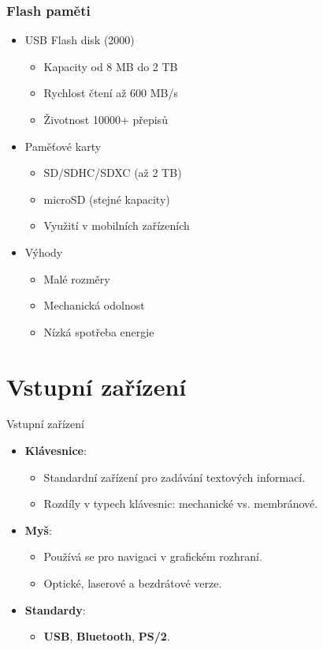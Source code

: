 \documentclass[aspectratio=43]{beamer}
\begin{document}
\begin{frame}
\frametitle{Flash paměti}
\begin{itemize}
\item USB Flash disk (2000)
  \begin{itemize}
  \item Kapacity od 8 MB do 2 TB
  \item Rychlost čtení až 600 MB/s
  \item Životnost 10000+ přepisů
  \end{itemize}
\item Paměťové karty
  \begin{itemize}
  \item SD/SDHC/SDXC (až 2 TB)
  \item microSD (stejné kapacity)
  \item Využití v mobilních zařízeních
  \end{itemize}
\item Výhody
  \begin{itemize}
  \item Malé rozměry
  \item Mechanická odolnost
  \item Nízká spotřeba energie
  \end{itemize}
\end{itemize}
\end{frame}

\section{Vstupní zařízení}
\begin{frame}{Vstupní zařízení}
    \begin{itemize}
        \item \textbf{Klávesnice}:
        \begin{itemize}
            \item Standardní zařízení pro zadávání textových informací.
            \item Rozdíly v typech klávesnic: mechanické vs. membránové.
        \end{itemize}
        \item \textbf{Myš}:
        \begin{itemize}
            \item Používá se pro navigaci v grafickém rozhraní.
            \item Optické, laserové a bezdrátové verze.
        \end{itemize}
        \item \textbf{Standardy}:
        \begin{itemize}
            \item \textbf{USB}, \textbf{Bluetooth}, \textbf{PS/2}.
        \end{itemize}
    \end{itemize}
\end{frame}
\end{document}
